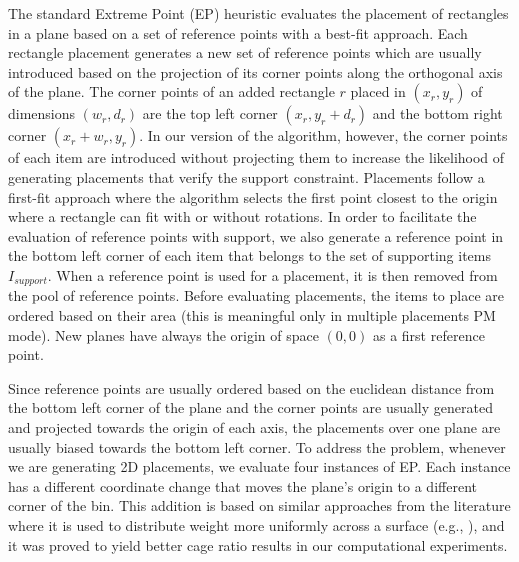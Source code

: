 The standard Extreme Point (EP) heuristic evaluates the placement of rectangles in a plane based on a set of reference points with a best-fit approach.
Each rectangle placement generates a new set of reference points which are usually introduced based on the projection of its corner points along the orthogonal axis of the plane.
The corner points of an added rectangle $r$ placed in $(x_r, y_r)$ of dimensions $(w_r, d_r)$ are the top left corner $(x_r, y_r + d_r)$ and the bottom right corner $(x_r + w_r, y_r)$.
In our version of the algorithm, however, the corner points of each item are introduced without projecting them to increase the likelihood of generating placements that verify the support constraint.
Placements follow a first-fit approach where the algorithm selects the first point closest to the origin where a rectangle can fit with or without rotations.
In order to facilitate the evaluation of reference points with support, we also generate a reference point in the bottom left corner of each item that belongs to the set of supporting items $I_{support}$.
When a reference point is used for a placement, it is then removed from the pool of reference points.
Before evaluating placements, the items to place are ordered based on their area (this is meaningful only in multiple placements PM mode).
New planes have always the origin of space $(0,0)$ as a first reference point.

Since reference points are usually ordered based on the euclidean distance from the bottom left corner of the plane and the corner points are usually generated and projected towards the origin of each axis, the placements over one plane are usually biased towards the bottom left corner.
To address the problem, whenever we are generating 2D placements, we evaluate four instances of EP. Each instance has a different coordinate change that moves the plane's origin to a different corner of the bin.
This addition is based on similar approaches from the literature where it is used to distribute weight more uniformly across a surface (e.g., \cite{GAJDA2022102559}), and it was proved to yield better cage ratio results in our computational experiments.

